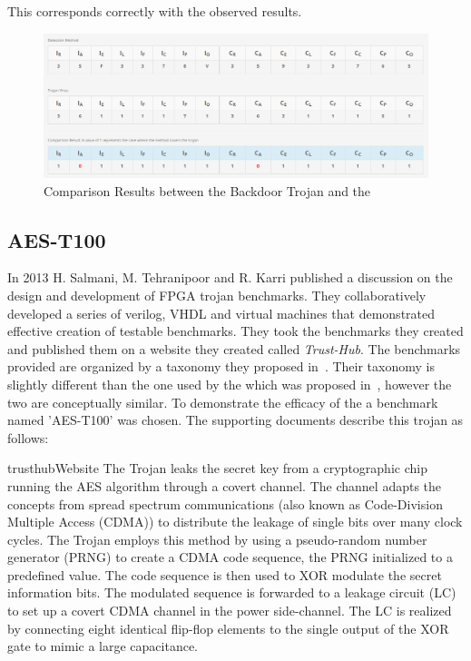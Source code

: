 This corresponds correctly with the observed results.
\begin{figure}[h]
\centering
\includegraphics[width=1\linewidth]{Figures/backdoorComparison}
\caption[Comparison Results between the Backdoor Trojan and the \Name]{Comparison Results between the Backdoor Trojan and the \Name}
\label{fig:backdoorComparison}
\end{figure}

\subsection{AES-T100} \label{sec:aesT100}
In 2013 H. Salmani, M. Tehranipoor and R. Karri published a discussion on the design and development of \acrshort{FPGA} trojan benchmarks.
They collaboratively developed a series of verilog, VHDL and virtual machines that demonstrated effective creation of testable benchmarks.
They took the benchmarks they created and published them on a website they created called \textit{Trust-Hub}.
The benchmarks provided are organized by a taxonomy they proposed in~\cite{trustHubPaper}.
Their taxonomy is slightly different than the one used by the \NameNoPeriod which was proposed in~\cite{samerAttribute}, however the two are conceptually similar.
To demonstrate the efficacy of the \NameNoPeriod a benchmark named 'AES-T100' was chosen. 
The supporting documents describe this trojan as follows:
\begin{displaycquote}{trusthubWebsite}
	The Trojan leaks the secret key from a cryptographic chip running the AES algorithm through a covert channel. The channel adapts the concepts from spread spectrum communications (also known as Code-Division Multiple Access (CDMA)) to distribute the leakage of single bits over many clock cycles. The Trojan employs this method by using a pseudo-random number generator (PRNG) to create a CDMA code sequence, the PRNG initialized to a predefined value. The code sequence is then used to XOR modulate the secret information bits. The modulated sequence is forwarded to a leakage circuit (LC) to set up a covert CDMA channel in the power side-channel. The LC is realized by connecting eight identical flip-flop elements to the single output of the XOR gate to mimic a large capacitance.
\end{displaycquote}

